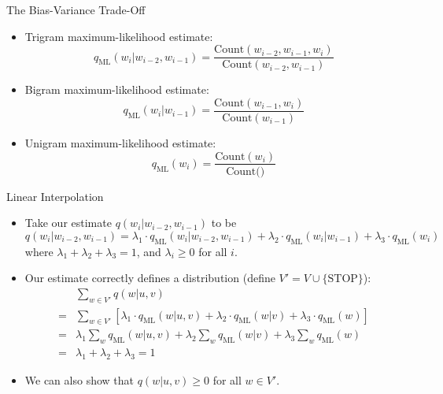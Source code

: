 \documentclass[handout]{beamer}
\begin{document}
\begin{frame}{The Bias-Variance Trade-Off}
    \scriptsize
    \begin{itemize}
        \item Trigram maximum-likelihood estimate:
        \[
        q_{\text{ML}}(w_i | w_{i-2}, w_{i-1}) = \frac{{\text{Count}(w_{i-2}, w_{i-1}, w_i)}}{{\text{Count}(w_{i-2}, w_{i-1})}}
        \]
        \item Bigram maximum-likelihood estimate:
        \[
        q_{\text{ML}}(w_i | w_{i-1}) = \frac{{\text{Count}(w_{i-1}, w_i)}}{{\text{Count}(w_{i-1})}}
        \]
        \item Unigram maximum-likelihood estimate:
        \[
        q_{\text{ML}}(w_i) = \frac{{\text{Count}(w_i)}}{{\text{Count()}}}
        \]
    \end{itemize}
\end{frame}

\begin{frame}{Linear Interpolation}
    \scriptsize
    \begin{itemize}
     \item Take our estimate $q(w_i | w_{i-2}, w_{i-1})$ to be
    \[
    q(w_i | w_{i-2}, w_{i-1}) = \lambda_1 \cdot q_{\text{ML}}(w_i | w_{i-2}, w_{i-1}) + \lambda_2 \cdot q_{\text{ML}}(w_i | w_{i-1}) + \lambda_3 \cdot q_{\text{ML}}(w_i)
    \]
    where $\lambda_1 + \lambda_2 + \lambda_3 = 1$, and $\lambda_i \geq 0$ for all $i$.
    
    \item Our estimate correctly defines a distribution (define $V' = V \cup \{\text{STOP}\}$):
    \[
    \begin{aligned}
        & \sum_{w \in V'} q(w | u, v) \\
        = & \sum_{w \in V'} [\lambda_1 \cdot q_{\text{ML}}(w | u, v) + \lambda_2 \cdot q_{\text{ML}}(w | v) + \lambda_3 \cdot q_{\text{ML}}(w)] \\
        = & \lambda_1 \sum_{w} q_{\text{ML}}(w | u, v) + \lambda_2 \sum_{w} q_{\text{ML}}(w | v) + \lambda_3 \sum_{w} q_{\text{ML}}(w) \\
        = & \lambda_1 + \lambda_2 + \lambda_3 = 1
    \end{aligned}
    \]
    \item We can also show that $q(w | u, v) \geq 0$ for all $w \in V'$.
    \end{itemize}

    
    
\end{frame}
\end{document}
